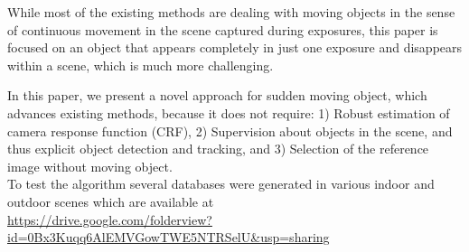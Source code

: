 \documentclass[preprint,12pt,3p]{elsarticle}
\begin{document}
While most of the existing methods are dealing with moving objects in the sense of continuous movement in the scene captured during exposures, this paper is focused on an object that appears completely in just one exposure and disappears within a scene, which is much more challenging.  

 In this paper, we present a novel approach for sudden moving object, which advances existing methods, because it does not require: 1) Robust estimation of camera response function (CRF), 2) Supervision about objects in the scene, and thus explicit object detection and tracking, and 3) Selection of the reference image without moving object.\\
 To test the algorithm several databases were generated in various indoor and outdoor scenes which are available at\\ \url{https://drive.google.com/folderview?id=0Bx3Kuqq6AlEMVGowTWE5NTRSelU&usp=sharing}
 
 
% 
\end{document}
